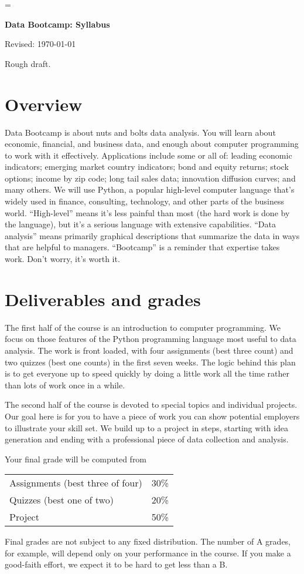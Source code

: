 \documentclass[11pt]{article}
\begin{document}
\parskip=\bigskipamount
\parindent=0.0in
\thispagestyle{empty}


\bigskip\bigskip
\centerline{\Large \bf Data Bootcamp:  Syllabus}
\centerline{Revised: \today}

Rough draft.

\section*{Overview}

Data Bootcamp is about nuts and bolts data analysis. You will learn about economic, financial, and business
data, and enough about computer programming to work with it effectively.
Applications include some or all of: leading economic indicators; emerging market country indicators;
bond and equity returns; stock options; income by zip code; long tail sales data; innovation diffusion curves; and many others.
We will use Python, a popular high-level computer language that's widely used in finance, consulting,
technology, and other parts of the business world.
``High-level'' means it's less painful than most (the hard work is done by the language),
but it's a serious language with extensive capabilities.
``Data analysis'' means primarily graphical descriptions that summarize the data
in ways that are helpful to managers.
``Bootcamp'' is a reminder that expertise takes work. Don't worry, it's worth it.


\section*{Deliverables and grades}

The first half of the course is an introduction to computer programming.
We focus on those features of the Python programming language most useful to data analysis.
The work is front loaded, with four assignments (best three count) and two quizzes (best one counts)
in the first seven weeks.
The logic behind this plan is to get everyone up to speed quickly
by doing a little work all the time rather than lots of work once in a while.

The second half of the course is devoted to special topics and individual projects.
Our goal here is for you to have a piece of work you can show potential employers
to illustrate your skill set.
We build up to a project in steps, starting with idea generation and ending
with a professional piece of data collection and analysis.

Your final grade will be computed from
\begin{center}
\begin{tabular}{ll}
Assignments (best three of four) & 30\% \\
Quizzes  (best one of two)   & 20\% \\
Project     & 50\% \\
\end{tabular}
\end{center}
Final grades are not subject to any fixed distribution.
The number of A grades, for example,
will depend only on your performance in the course.
If you make a good-faith effort,
we expect it to be hard to get less than a B.
\end{document}
